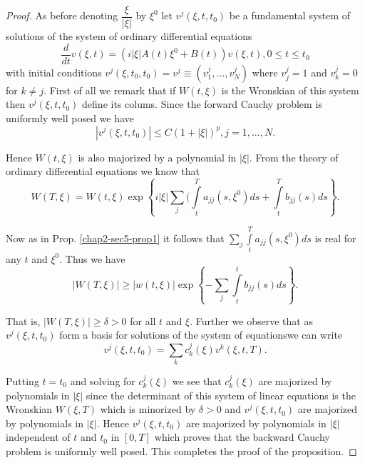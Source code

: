 \begin{proof}
As before denoting $\dfrac{\xi }{|\xi|}$ by $\xi^0$ let $v^j(\xi, t,
t_0)$ be a fundamental system of solutions of the system of ordinary
differential equations  
$$
\frac{d}{dt}v(\xi,  t)= (i |\xi | A(t) \xi^0 + B(t)) v(\xi,  t),  0 
\leq t \leq t_0 
$$
with initial conditions $v^j (\xi,  t_0,  t_0)= v^j \equiv (v^j_1 , 
\ldots ,  v^j_N)$ where $v^j_j = 1$ and $v^j_k = 0$ for $k \neq
j$. First of all we remark that if $W(t,  \xi)$ is the Wronskian of
this system then $v^j (\xi,  t,  t_0) $ define its colums. Since the
forward Cauchy problem is uniformly well posed we have  
$$
|v^j (\xi,  t,  t_0)| \leq C(1 + |\xi |)^p,  j=1,  \ldots ,  N. 
$$

Hence $W (t, \xi )$ is also majorized by a polynomial in $|\xi 
|$. From the theory of ordinary differential equations we know that  
$$
 W(T, \xi ) = W (t,  \xi ) \exp \left\{ i | \xi | \sum_j
 (\int\limits^T_t a_{jj}  (s,  \xi^0 )ds + \int\limits^T_t b_{jj}(s)ds
 \right\}.  
 $$
 
Now as in Prop. \ref{chap2-sec5-prop1} it follows that $\sum\limits_j
\int\limits^T_t a_{jj}(s,  \xi^0) ds$ is real for any $t$ and
$\xi^0$. Thus we have  
 $$
 |W(T,  \xi)| \geq |w(t,  \xi ) | \exp \left\{ - \sum\limits_{j}
 \int\limits^t_t b_{jj} (s) ds \right\}.   
 $$

 That is,  $|W(T,  \xi)| \geq \delta > 0$ for all $t$ and
 $\xi$. Further we observe that as $v^j(\xi,  t,  t_0)$ form a basis
 for solutions of the system of equations\pageoriginale we can write 
 $$
 v^j (\xi, t, t_0) = \sum_{k} c^j_k (\xi) v^k (\xi, t, T). 
 $$

 Putting $t = t_0$ and solving for $c^j_k (\xi) $ we see that $c^j_k
 (\xi)$ are majorized by polynomials in $|\xi |$ since the determinant
 of this system of linear equations is the Wronskian $W(\xi,  T)$
 which is minorized by $\delta > 0$ and $v^j (\xi,  t,  t_0) $ are
 majorized by polynomials in $|\xi|$. Hence $v^j (\xi,  t,  t_0)$ are
 majorized by polynomials in $|\xi|$ independent of $t$ and $t_0$ in
$[0, T]$ which proves that the backward Cauchy problem is
 uniformly well posed. This completes the proof of the proposition. 
\end{proof}
